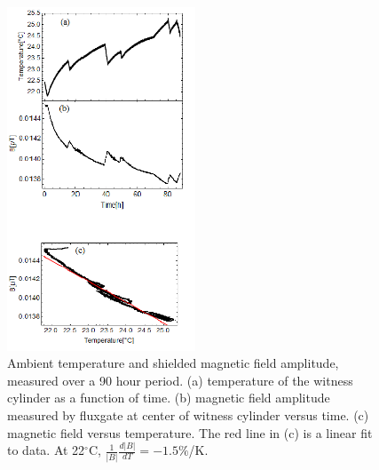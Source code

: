 \begin{figure}
\begin{center}
   \includegraphics[width=0.5\textwidth]{B_vs_T.png}
    \caption{Ambient temperature and shielded magnetic field
      amplitude, measured over a 90 hour period. (a) temperature of
      the witness cylinder as a function of time.  (b) magnetic field
      amplitude measured by fluxgate at center of witness cylinder
      versus time.  (c) magnetic field versus temperature. The red
      line in (c) is a linear fit to data. At 22$^\circ$C,
      $\frac{1}{|B|}\frac{d|B|}{dT}=-1.5\%$/K.}
    \label{fig:B_vs_Temp}
    \end{center}
\end{figure} 



